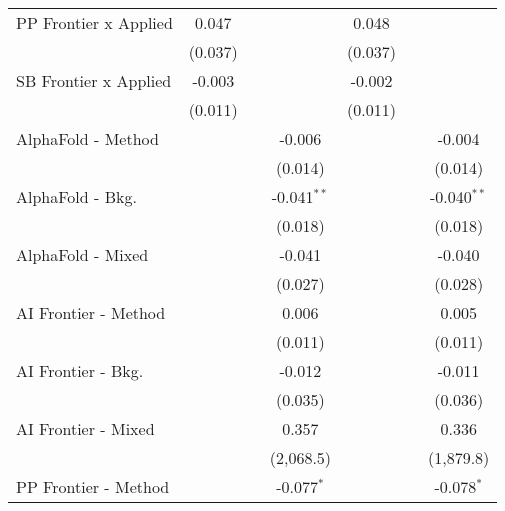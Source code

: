 \begin{tabular}{lcccccc}
   PP Frontier x Applied        & 0.047          &         &               & 0.048          &         &   \\   
                                & (0.037)        &         &               & (0.037)        &         &   \\   
   SB Frontier x Applied        & -0.003         &         &               & -0.002         &         &   \\   
                                & (0.011)        &         &               & (0.011)        &         &   \\   
   AlphaFold - Method           &                &         & -0.006        &                &         & -0.004\\   
                                &                &         & (0.014)       &                &         & (0.014)\\   
   AlphaFold - Bkg.             &                &         & -0.041$^{**}$ &                &         & -0.040$^{**}$\\   
                                &                &         & (0.018)       &                &         & (0.018)\\   
   AlphaFold - Mixed            &                &         & -0.041        &                &         & -0.040\\   
                                &                &         & (0.027)       &                &         & (0.028)\\   
   AI Frontier - Method         &                &         & 0.006         &                &         & 0.005\\   
                                &                &         & (0.011)       &                &         & (0.011)\\   
   AI Frontier - Bkg.           &                &         & -0.012        &                &         & -0.011\\   
                                &                &         & (0.035)       &                &         & (0.036)\\   
   AI Frontier - Mixed          &                &         & 0.357         &                &         & 0.336\\   
                                &                &         & (2,068.5)     &                &         & (1,879.8)\\   
   PP Frontier - Method         &                &         & -0.077$^{*}$  &                &         & -0.078$^{*}$\\   

\end{tabular}
